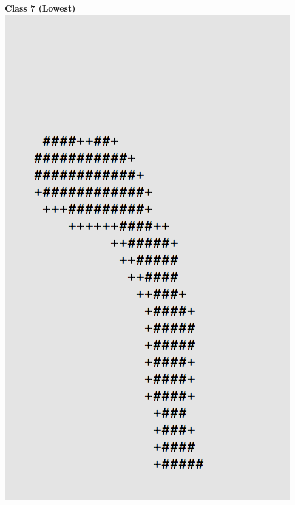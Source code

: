 \documentclass[11pt]{article}
\begin{document}
\begin{center}
\begin{multicols}{2}
\textbf{Class 7 (Lowest)}\\
\includegraphics[scale=0.4]{part1/1/low_7.png}
\end{multicols}
\end{center}
\break
\end{document}
